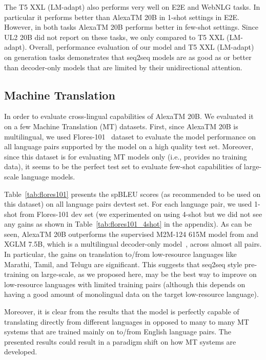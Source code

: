 The T5 XXL (LM-adapt) also performs very well on E2E and WebNLG tasks. In particular it performs better than {AlexaTM 20B} in 1-shot settings in E2E. However, in both tasks {AlexaTM 20B} performs better in few-shot settings. Since UL2 20B did not report on these tasks, we only compared to T5 XXL (LM-adapt). Overall, performance evaluation of our model and T5 XXL (LM-adapt) on generation tasks demonstrates that seq2seq models are as good as or better than decoder-only models that are limited by their unidirectional attention.

\subsection{Machine Translation}
\label{sec:translation-tasks}

In order to evaluate cross-lingual capabilities of {AlexaTM 20B}. We evaluated it on a few Machine Translation (MT) datasets. First, since {AlexaTM 20B} is multilingual, we used Flores-101~\citep{Goyal2022TheFE} dataset to evaluate the model performance on all language pairs supported by the model on a high quality test set. Moreover, since this dataset is for evaluating MT models only (i.e., provides no training data), it seems to be the perfect test set to evaluate few-shot capabilities of large-scale language models. 

Table~\ref{tab:flores101} presents the spBLEU scores (as recommended to be used on this dataset) on all language pairs devtest set. For each language pair, we used 1-shot from Flores-101 dev set (we experimented on using 4-shot but we did not see any gains as shown in Table~\ref{tab:flores101_4shot} in the appendix).  As can be seen, {AlexaTM 20B} outperforms the supervised M2M-124 615M model from \cite{Goyal2022TheFE} and XGLM 7.5B, which is a multilingual decoder-only model~\citep{Lin2021FewshotLW}, across almost all pairs. In particular, the gains on translation to/from low-resource languages like Marathi, Tamil, and Telugu are significant. This suggests that seq2seq style pre-training on large-scale, as we proposed here, may be the best way to improve on low-resource languages with limited training pairs (although this depends on having a good amount of monolingual data on the target low-resource language). 

Moreover, it is clear from the results that the model is perfectly capable of translating directly from different languages in opposed to many to many MT systems that are trained mainly on to/from English language pairs. The presented results could result in a paradigm shift on how MT systems are developed.

